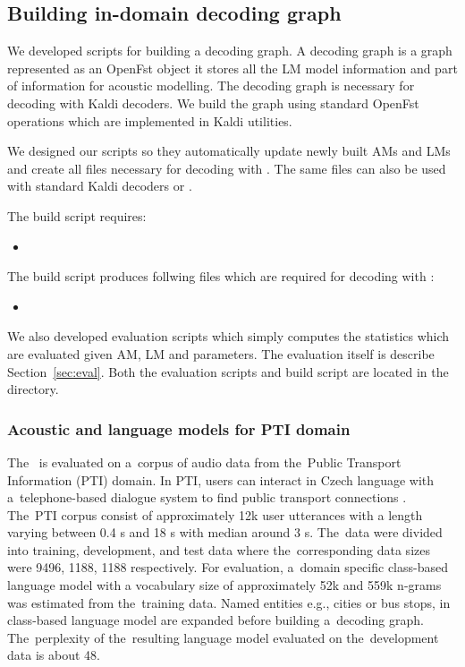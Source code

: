 \subsection{Building in-domain decoding graph}
\label{sub:hclg}
We developed scripts for building a decoding graph. 
A decoding graph is a graph represented as an OpenFst object it stores all the \ac{LM} model information and part of information for acoustic modelling. 
The decoding graph is necessary for decoding with Kaldi decoders.
We build the  graph using standard OpenFst operations which are implemented in Kaldi utilities. 

We designed our scripts so they automatically update newly built \acp{AM} and \acp{LM} and create all files necessary for decoding with .
The same files can also be used with standard Kaldi decoders or .

The  build script requires:
\begin{itemize}
    \item {}
\end{itemize}

The  build script produces follwing files which are required for decoding with :
\begin{itemize}
    \item {}
\end{itemize}

We also developed evaluation scripts which simply computes the statistics which are evaluated given \ac{AM}, \ac{LM} and parameters.
The evaluation itself is describe Section~\ref{sec:eval}.
Both the evaluation scripts and build  script are located in the~ directory.

\subsubsection*{Acoustic and language models for \acs{PTI} domain}
\label{sec:ptilm}
The~ is evaluated on a~corpus of audio data from the~Public Transport Information (PTI) domain.
In PTI, users can interact in Czech language with a~telephone-based dialogue system to find public transport connections \cite{ptics2014url}.
The~PTI corpus consist of approximately 12k user utterances with a length varying between 0.4 s and 18 s with median around 3 s.
The~data were divided into training, development, and test data where the~corresponding data sizes were 9496, 1188, 1188 respectively.
For evaluation, a~domain specific class-based language model with a vocabulary size of approximately 52k  and 559k n-grams was estimated from the~training data.
Named entities e.g., cities or bus stops, in class-based language model are expanded before building a~decoding graph.
The~perplexity of the~resulting language model evaluated on the~development data is about 48.


